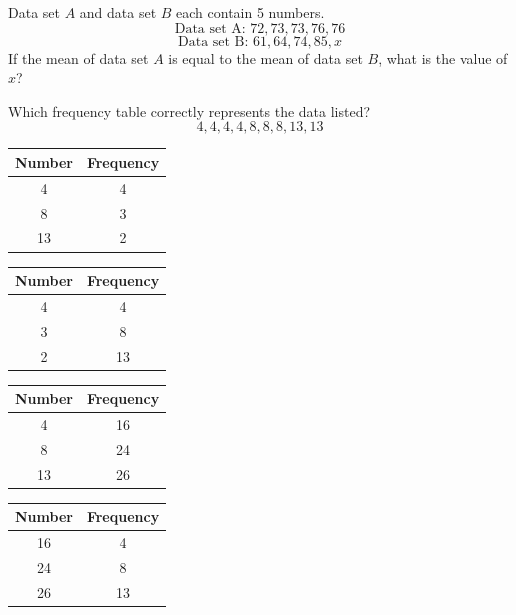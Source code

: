 \question[1]
Data set $A$ and data set $B$ each contain 5 numbers.
\[
  \text{Data set A: }72,73,73,76,76
\]
\[
  \text{Data set B: }61, 64, 74, 85, x
\]
If the mean of data set $A$ is equal to the mean of data set $B$, what is the value of $x$?
\begin{choices}
\end{choices}


\newpage


\question[1]
Which frequency table correctly represents the data listed?
\[
  4,4,4,4,8,8,8,13,13
\]
\vspace{0.5em}
\begin{choices}
  \CorrectChoice \parbox[t][7\baselineskip][t]{0.38\linewidth}{\centering
    \begin{tabular}{|c|c|}
      \hline
      Number & Frequency \\
      \hline
      4 & 4 \\
      \hline
      8 & 3 \\
      \hline
      13 & 2 \\
      \hline
    \end{tabular}}
  \choice \parbox[t][7\baselineskip][t]{0.38\linewidth}{\centering
    \begin{tabular}{|c|c|}
      \hline
      Number & Frequency \\
      \hline
      4 & 4 \\
      \hline
      3 & 8 \\
      \hline
      2 & 13 \\
      \hline
    \end{tabular}}
  \choice \parbox[t][7\baselineskip][t]{0.38\linewidth}{\centering
    \begin{tabular}{|c|c|}
      \hline
      Number & Frequency \\
      \hline
      4 & 16 \\
      \hline
      8 & 24 \\
      \hline
      13 & 26 \\
      \hline
    \end{tabular}}
  \choice \parbox[t][7\baselineskip][t]{0.38\linewidth}{\centering
    \begin{tabular}{|c|c|}
      \hline
      Number & Frequency \\
      \hline
      16 & 4 \\
      \hline
      24 & 8 \\
      \hline
      26 & 13 \\
      \hline
    \end{tabular}}
\end{choices}




